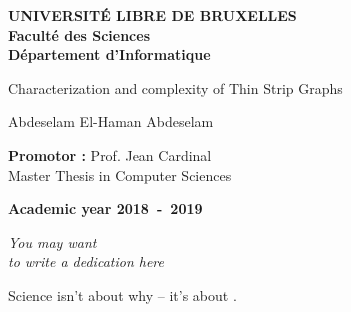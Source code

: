 \documentclass[12pt,a4paper,oneside]{book}
\let\emph\relax %
\theoremstyle{definition}
\theoremstyle{remark}
\theoremstyle{plain}
\numberwithin{theorem}{section}
\begin{document}
\frontmatter
\begin{titlepage}
\begin{center}
\textbf{UNIVERSIT\'E LIBRE DE BRUXELLES}\\
\textbf{Facult\'e des Sciences}\\
\textbf{D\'epartement d'Informatique}
\vfill{}\vfill{}

{\Huge  Characterization and complexity of \vspace*{.5cm} \linebreak[4] Thin Strip Graphs}


{\Huge \par}
\begin{center}{\LARGE Abdeselam El-Haman Abdeselam}\end{center}{\Huge \par}
\vfill{}\vfill{}
\begin{flushright}{\large \textbf{Promotor :} Prof. Jean Cardinal}\\\hfill{}{\large Master Thesis in Computer Sciences}\\
{\large }\hfill{}{}\end{flushright}{\large\par}
\vfill{}\vfill{}\enlargethispage{3cm}
\textbf{Academic year 2018~-~2019}
\end{center}
\end{titlepage}
\newpage
\thispagestyle{empty}
\null

\newenvironment{vcenterpage}
{\newpage\thispagestyle{empty}
\vspace*{\fill}}
{\vspace*{\fill}\par\pagebreak}

\begin{vcenterpage}
\begin{flushright}
    \large\em\null\vskip1in
    You may want\\
   to write a dedication here\vfill
  \end{flushright}
\end{vcenterpage}
\thispagestyle{empty}
\vspace*{5cm}

\begin{fquote}
  Science isn't about why -- it's about \emph{why not}.
\end{fquote}
\end{document}

